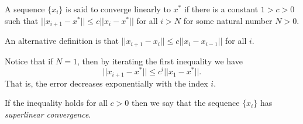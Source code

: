 \documentclass[12pt]{article}
\begin{document}
A sequence $\{x_i\}$ is said to converge linearly to $x^*$ if there is a constant $1>c>0$ such that $||x_{i+1}-x^*|| \leq c ||x_i -x^*||$ for all $i>N$ for some natural number $N>0$.

An alternative definition is that $||x_{i+1}-x_i|| \leq c ||x_i - x_{i-1} ||$ for all $i$.

Notice that if $N=1$, then by iterating the first inequality we have
$$
||x_{i+1}-x^*|| \leq c^i ||x_1 -x^*||.
$$
That is, the error decreases exponentially with the index $i$.

If the inequality holds for all $c>0$ then we say that the sequence $\{x_i\}$
has \emph{superlinear convergence}.


\end{document}
